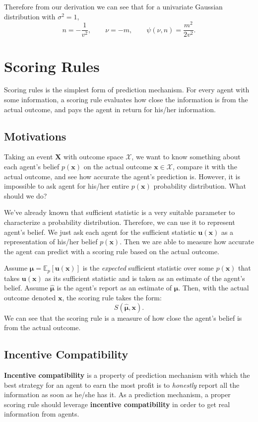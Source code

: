 \documentclass[12pt]{article}
\begin{document}
Therefore from our derivation we can see that for a univariate Gaussian distribution with $\sigma^2=1$, $$n=-\frac{1}{v^2},\qquad \nu=-m,\qquad\psi(\nu,n)=\frac{m^2}{2v^2}.$$

\newpage
\section{Scoring Rules}
Scoring rules is the simplest form of prediction mechanism. For every agent with some information, a scoring rule evaluates how close the information is from the actual outcome, and pays the agent in return for his/her information.

\subsection{Motivations}
Taking an event $\mathbf{X}$ with outcome space $\mathcal{X}$, we want to know something about each agent's belief $p(\mathbf{x})$ on the actual outcome $\mathbf{x}\in \mathcal{X}$, compare it with the actual outcome, and see how accurate the agent's prediction is. However, it is impossible to ask agent for his/her entire $p(\mathbf{x})$ probability distribution. What should we do?

We've already known that sufficient statistic is a very suitable parameter to characterize a probability distribution. Therefore, we can use it to represent agent's belief. We just ask each agent for the sufficient statistic $\mathbf{u}(\mathbf{x})$ as a representation of his/her belief $p(\mathbf{x})$. Then we are able to measure how accurate the agent can predict with a scoring rule based on the actual outcome.

Assume $\bm{\mu}=\mathbb{E}_p[\mathbf{u}(\mathbf{x})]$ is the \textit{expected} sufficient statistic over some $p(\mathbf{x})$ that takes $\mathbf{u}(\mathbf{x})$ as its sufficient statistic and is taken as an estimate of the agent's belief. Assume $\bm{\hat{\mu}}$ is the agent's report as an estimate of $\bm{\mu}$. Then, with the actual outcome denoted $\mathbf{x}$, the scoring rule takes the form:
\[S(\bm{\hat{\mu}},\mathbf{x}).\]
We can see that the scoring rule is a measure of how close the agent's belief is from the actual outcome.

\subsection{Incentive Compatibility}
\textbf{Incentive compatibility} is a property of prediction mechanism with which the best strategy for an agent to earn the most profit is to \textit{honestly} report all the information as soon as he/she has it. As a prediction mechanism, a proper scoring rule should leverage \textbf{incentive compatibility} in order to get real information from agents.
\end{document}
